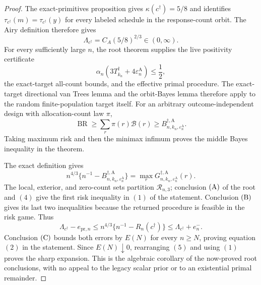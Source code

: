 \documentclass{article}
\begin{document}
\begin{proof}
The exact-primitives proposition gives
\(\kappa(c^\dagger)=5/8\) and identifies
\(\tau_{c^\dagger}(m)=\tau_{c^\dagger}(y)\) for every labeled schedule in the response-count orbit.  The Airy definition therefore gives
\[
\Lambda_{c^\dagger}=C_A(5/8)^{2/3}\in(0,\infty).
\tag{1}
\]
For every sufficiently large \(n\), the root theorem supplies the live positivity certificate
\[
\alpha_n(3T_{k_n}^\dagger+4\varepsilon_n^{\mathrm A})\le\frac12,
\tag{2}
\]
the exact-target all-count bounds, and the effective primal procedure.  The exact-target directional van Trees lemma and the orbit-Bayes lemma therefore apply to the random finite-population target itself.  For an arbitrary outcome-independent design with allocation-count law \(\pi\),
\[
\operatorname{BR}\ge\sum_r\pi(r)\mathcal B(r)
\ge B_{n,k_n,\varepsilon_n^{\mathrm A}}^{\dagger,\mathrm A}.
\tag{3}
\]
Taking maximum risk and then the minimax infimum proves the middle Bayes inequality in the theorem.

The exact definition gives
\[
n^{4/3}\{n^{-1}-B_{n,k_n,\varepsilon_n^{\mathrm A}}^{\dagger,\mathrm A}\}
=\max_rG_{n,k_n,\varepsilon_n^{\mathrm A}}^{\dagger,\mathrm A}(r).
\tag{4}
\]
The local, exterior, and zero-count sets partition \(\mathcal R_{n,3}\); conclusion \({\rm(A)}\) of the root and \((4)\) give the first risk inequality in \((1)\) of the statement.  Conclusion \({\rm(B)}\) gives its last two inequalities because the returned procedure is feasible in the risk game.  Thus
\[
\Lambda_{c^\dagger}-e_{\mathrm{pr},n}
\le n^{4/3}\{n^{-1}-R_n(c^\dagger)\}
\le\Lambda_{c^\dagger}+e_n^-.
\tag{5}
\]
Conclusion \({\rm(C)}\) bounds both errors by \(E(N)\) for every \(n\ge N\), proving equation \((2)\) in the statement.  Since \(E(N)\downarrow0\), rearranging \((5)\) and using \((1)\) proves the sharp expansion.  This is the algebraic corollary of the now-proved root conclusions, with no appeal to the legacy scalar prior or to an existential primal remainder.
\end{proof}
\end{document}
